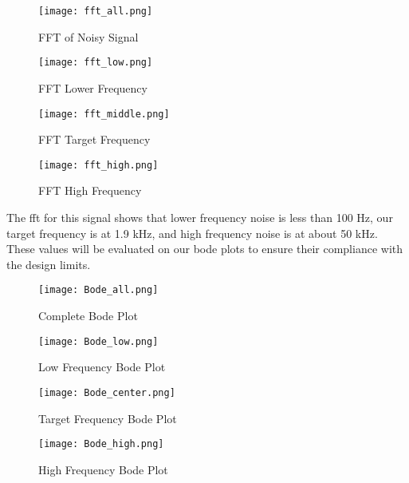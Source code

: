 \documentclass[12pt]{report}
\begin{document}
\begin{figure}[ht!]
    \centering
    \texttt{[image: fft\_all.png]}
    \caption{FFT of Noisy Signal}
    \label{fig:my_label}
\end{figure}

\begin{figure}[ht!]
    \centering
    \texttt{[image: fft\_low.png]}
    \caption{FFT Lower Frequency}
    \label{fig:my_label}
\end{figure}
\begin{figure}[ht!]
    \centering
    \texttt{[image: fft\_middle.png]}
    \caption{FFT Target Frequency}
    \label{fig:my_label}
\end{figure}

\begin{figure}[ht!]
    \centering
    \texttt{[image: fft\_high.png]}
    \caption{FFT High Frequency}
    \label{fig:my_label}
\end{figure}

The fft for this signal shows that lower frequency noise is less than 100 Hz, our target frequency is at 1.9 kHz, and high frequency noise is at about 50 kHz. These values will be evaluated on our bode plots to ensure their compliance with the design limits. \par 
\clearpage

\begin{figure}[ht!]
    \centering
    \texttt{[image: Bode\_all.png]}
    \caption{Complete Bode Plot}
    \label{fig:my_label}
\end{figure}

\begin{figure}[ht!]
    \centering
    \texttt{[image: Bode\_low.png]}
    \caption{Low Frequency Bode Plot}
    \label{fig:my_label}
\end{figure}

\begin{figure}[ht!]
    \centering
    \texttt{[image: Bode\_center.png]}
    \caption{Target Frequency Bode Plot}
    \label{fig:my_label}
\end{figure}

\begin{figure}[ht!]
    \centering
    \texttt{[image: Bode\_high.png]}
    \caption{High Frequency Bode Plot}
    \label{fig:my_label}
\end{figure}
\clearpage
\end{document}
